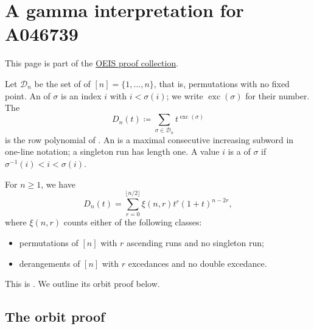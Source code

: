 

\section[oeisProofA046739]{A gamma interpretation for A046739}

This page is part of the \hyperref[oeisProofs]{OEIS proof collection}.

Let $\mathcal{D}_n$ be the set of  of
$[n]=\{1,\dotsc,n\}$, that is, permutations with no fixed point.
An  of $\sigma$ is an index $i$ with $i<\sigma(i)$;
we write $\operatorname{exc}(\sigma)$ for their number.
The 
\[
 D_n(t)\coloneqq\sum_{\sigma\in\mathcal{D}_n}
 t^{\operatorname{exc}(\sigma)}
\]
is the row polynomial of .
An  is a maximal consecutive increasing subword
in one-line notation; a singleton run has length one.
A value $i$ is a  of $\sigma$ if
$\sigma^{-1}(i)<i<\sigma(i)$.

\begin{theorem}
For $n\geq 1$, we have
\[
 D_n(t)=\sum_{r=0}^{\lfloor n/2\rfloor}
 \xi(n,r)t^r(1+t)^{n-2r},
\]
where $\xi(n,r)$ counts either of the following classes:
\begin{itemize}
\item permutations of $[n]$ with $r$ ascending runs and no singleton run;
\item derangements of $[n]$ with $r$ excedances and no double excedance.
\end{itemize}
\end{theorem}

This is \cite[Thm.~1.4]{AthanasiadisSavvidou2012}.
We outline its orbit proof below.

\subsection[oeisA046739OrbitProof]{The orbit proof}

